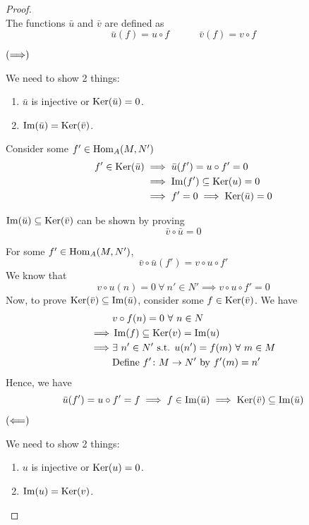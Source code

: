 \begin{proof} \ \\
	The functions \(\bar{u}\) and \(\bar{v}\) are defined as
	\[
		\bar{u}(f) = u \circ f \quad\quad\quad
		\bar{v}(f) = v \circ f
	\]

	\( \left( \Longrightarrow \right) \)

	We need to show 2 things:
	\begin{enumerate}
		\item \(\bar{u}\) is injective or \(\operatorname{Ker}(\bar{u}) = 0\).
		\item \(\operatorname{Im}(\bar{u}) = \operatorname{Ker}(\bar{v})\).
	\end{enumerate}

	Consider some \(f' \in \operatorname{Hom}_A(M, N')\)
	\begin{align*}
		f' \in \operatorname{Ker}(\bar{u})
		&\implies \bar{u}(f') = u \circ f' = 0 \\
		&\implies \operatorname{Im}(f') \subseteq \operatorname{Ker}(u) = 0 \\
		&\implies f' = 0 \implies \operatorname{Ker}(\bar{u}) = 0
	\end{align*}

	\(\operatorname{Im}(\bar{u}) \subseteq \operatorname{Ker}(\bar{v})\) can be shown by proving
	\[
		\bar{v} \circ \bar{u} = 0
	\]

	For some \(f' \in \operatorname{Hom}_A(M, N')\),
	\[
		\bar{v} \circ \bar{u}(f') = v \circ u \circ f'
	\]
	We know that
	\[
		v \circ u(n) = 0 \ \forall\ n' \in N'
		\implies v \circ u \circ f' = 0
	\]
	Now, to prove \(\operatorname{Ker}(\bar{v}) \subseteq \operatorname{Im}(\bar{u})\),
	consider some \(f \in \operatorname{Ker}(\bar{v})\).
	We have
	\begin{align*}
		&v \circ f (n) = 0 \ \forall\ n \in N \\
		\implies &\operatorname{Im}(f) \subseteq \operatorname{Ker}(v) = \operatorname{Im}(u) \\
		\implies &\exists\ n' \in N' \text{ s.t. } u(n') = f(m) \ \forall\ m \in M \\
		&\text{Define } f' \colon M \to N' \text{ by } f'(m) = n' \\
	\end{align*}
	Hence, we have
	\[
		\bar{u}(f') = u \circ f' = f
		\implies f \in \operatorname{Im}(\bar{u})
		\implies \operatorname{Ker}(\bar{v}) \subseteq \operatorname{Im}(\bar{u})
	\]

	\vspace{3em}

	\( \left( \Longleftarrow \right) \)

	We need to show 2 things:
	\begin{enumerate}
		\item \(u\) is injective or \(\operatorname{Ker}(u) = 0\).
		\item \(\operatorname{Im}(u) = \operatorname{Ker}(v)\).
	\end{enumerate}
\end{proof}


